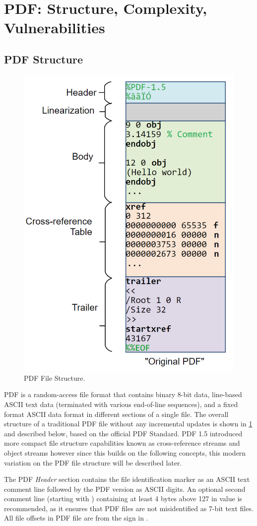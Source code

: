 \section{PDF: Structure, Complexity, Vulnerabilities}
\label{sec:pdf}

\subsection{PDF Structure}

\begin{figure}[t]
    \centering
    \includegraphics[width=0.65\linewidth]{figures/pdf-structure.png}
    \caption{PDF File Structure.}
    \label{fig:pdf-structure}
\end{figure}

PDF is a random-access file format that contains binary 8-bit data, line-based ASCII
text data (terminated with various end-of-line sequences), and a fixed format ASCII 
data format in different sections of a single file. The overall structure of a 
traditional PDF file without any incremental updates is shown in \cref{fig:pdf-structure} and 
described below, based on the official PDF Standard.
PDF 1.5 introduced more compact file structure capabilities known as cross-reference streams 
and object streams however since this builds on the following concepts, this modern 
variation on the PDF file structure will be described later.

The PDF \emph{Header} section contains the file identification marker as an ASCII
text comment line  followed by the PDF version as ASCII digits. 
An optional second comment line (starting with \lstcd{\%})
containing at least 4 bytes above 127 in value is recommended, as it ensures 
that PDF files are not misidentified as 7-bit text files. 
All file offsets in PDF file are from the \lstcd{\%} sign in .  

